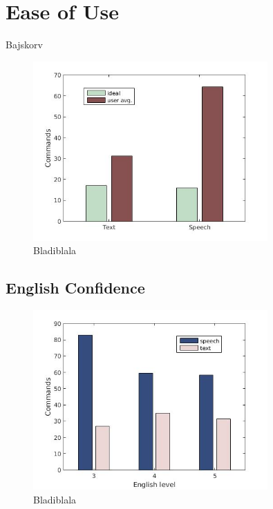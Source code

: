 \section{Ease of Use}
Bajskorv

\begin{figure}[p]
  \centering
  \includegraphics[width=0.8\textwidth]{images/ideal_cmd.jpg}
  \caption{Bladiblala}\label{ideal_cmd}
\end{figure}

\subsection{English Confidence}

\begin{figure}[p]
  \centering
  \includegraphics[width=0.8\textwidth]{images/english_cmd.jpg}
  \caption{Bladiblala}\label{eng_cmd}
\end{figure}

